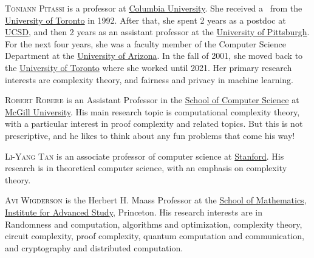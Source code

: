 \documentclass{toc}
\begin{document}
\begin{tocaboutauthors}
\begin{tocabout}[pitassi]
\textsc{Toniann Pitassi} is a professor at
\href{https://www.columbia.edu/}{Columbia University}. She received a
\phd\ from the \href{https://www.utoronto.ca/}{University of Toronto} in
1992. After that, she spent 2 years as a postdoc at
\href{https://ucsd.edu/}{UCSD}, and then 2 years as an assistant
professor at the \href{https://www.pitt.edu/}{University of Pittsburgh}.
For the next four years, she was a faculty member of
the Computer Science Department at the
\href{https://www.arizona.edu/}{University of Arizona}. In the fall of
2001, she moved back to the
\href{https://www.utoronto.ca/}{University of Toronto}
where she worked  %
until 2021. Her primary research interests are
complexity theory,
and   %
fairness and privacy in machine learning.
\end{tocabout}

\begin{tocabout}[robere]
\textsc{Robert Robere} is an Assistant Professor in the
\href{https://www.mcgill.ca/}{School of Computer Science} at
\href{https://www.cs.mcgill.ca/}{McGill University}. His main research
topic is computational complexity theory, with a particular interest
in proof complexity and related topics. But this is not prescriptive,
and he likes to think about any fun problems that %
come his way! %
\end{tocabout}

\begin{tocabout}[tan]
\textsc{Li-Yang Tan} is an associate professor of computer science at
\href{https://www.stanford.edu/}{Stanford}. His research is in theoretical 
computer science, with an emphasis on complexity theory.
\end{tocabout}

\begin{tocabout}[wigderson]
\textsc{Avi Wigderson} is the Herbert H. Maass Professor at the
\href{https://www.ias.edu/math}{School of Mathematics},
\href{https://www.ias.edu/}{Institute for Advanced Study},
Princeton. His research interests are in Randomness and computation,
algorithms and optimization, complexity theory, circuit complexity,
proof complexity, quantum computation and communication, and
cryptography and distributed computation.
\end{tocabout}

\end{tocaboutauthors}
\end{document}
